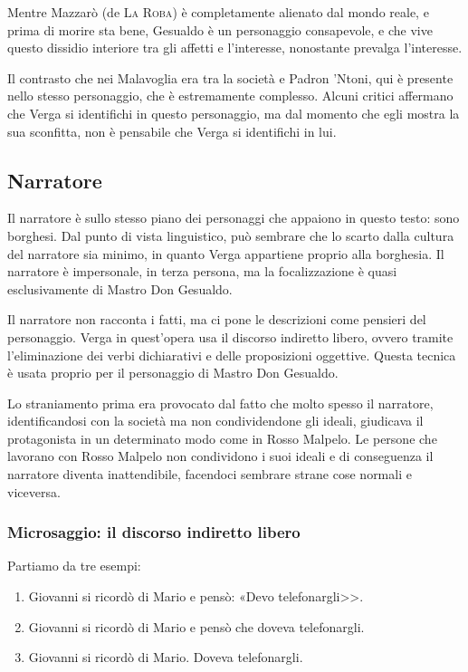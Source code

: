 \documentclass{book}
\begin{document}
Mentre Mazzarò (de \textsc{La Roba}) è completamente alienato dal mondo
reale, e prima di morire sta bene, Gesualdo è un personaggio
consapevole, e che vive questo dissidio interiore tra gli affetti e
l'interesse, nonostante prevalga l'interesse.

Il contrasto che nei Malavoglia era tra la società e Padron 'Ntoni, qui
è presente nello stesso personaggio, che è estremamente complesso.
Alcuni critici affermano che Verga si identifichi in questo personaggio,
ma dal momento che egli mostra la sua sconfitta, non è pensabile che
Verga si identifichi in lui.

\subsection{Narratore}

Il narratore è sullo stesso piano dei personaggi che appaiono in questo
testo: sono borghesi. Dal punto di vista linguistico, può sembrare che
lo scarto dalla cultura del narratore sia minimo, in quanto Verga
appartiene proprio alla borghesia. Il narratore è impersonale, in terza
persona, ma la focalizzazione è quasi esclusivamente di Mastro Don
Gesualdo.

Il narratore non racconta i fatti, ma ci pone le descrizioni come
pensieri del personaggio. Verga in quest'opera usa il discorso indiretto
libero, ovvero tramite l'eliminazione dei verbi dichiarativi e delle
proposizioni oggettive. Questa tecnica è usata proprio per il personaggio di
Mastro Don Gesualdo.

Lo straniamento prima era provocato dal fatto che molto spesso il
narratore, identificandosi con la società ma non condividendone gli
ideali, giudicava il protagonista in un determinato modo come in Rosso
Malpelo. Le persone che lavorano con Rosso Malpelo non condividono i
suoi ideali e di conseguenza il narratore diventa inattendibile,
facendoci sembrare strane cose normali e viceversa.

\subsubsection{Microsaggio: il discorso indiretto libero}

Partiamo da tre esempi:
\begin{enumerate}
\item Giovanni si ricordò di Mario e pensò: «Devo telefonargli>>.
\item Giovanni si ricordò di Mario e pensò che doveva telefonargli.
\item Giovanni si ricordò di Mario. Doveva telefonargli.
\end{enumerate}
\end{document}
